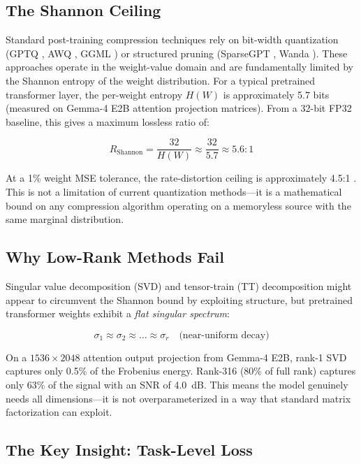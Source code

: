 \documentclass[11pt,a4paper]{article}
\begin{document}
\subsection{The Shannon Ceiling}

Standard post-training compression techniques rely on bit-width quantization (GPTQ
\cite{frantar2023gptq}, AWQ \cite{lin2024awq}, GGML \cite{gerganov2023ggml}) or
structured pruning (SparseGPT \cite{frantar2023sparsegpt}, Wanda \cite{sun2023wanda}).
These approaches operate in the weight-value domain and are fundamentally limited by
the Shannon entropy of the weight distribution. For a typical pretrained transformer
layer, the per-weight entropy $H(W)$ is approximately 5.7 bits (measured on Gemma-4
E2B attention projection matrices). From a 32-bit FP32 baseline, this gives a maximum
lossless ratio of:

\[
	R_{\text{Shannon}} = \frac{32}{H(W)} \approx \frac{32}{5.7} \approx 5.6:1
\]

At a 1\% weight MSE tolerance, the rate-distortion ceiling is approximately 4.5:1
\cite{shannon1959coding}. This is not a limitation of current quantization methods---it
is a mathematical bound on any compression algorithm operating on a memoryless source
with the same marginal distribution.

\subsection{Why Low-Rank Methods Fail}

Singular value decomposition (SVD) and tensor-train (TT) decomposition might appear to
circumvent the Shannon bound by exploiting structure, but pretrained transformer weights
exhibit a \emph{flat singular spectrum}:

\[
	\sigma_1 \approx \sigma_2 \approx \dots \approx \sigma_r \quad \text{(near-uniform decay)}
\]

On a $1536 \times 2048$ attention output projection from Gemma-4 E2B, rank-1 SVD captures
only 0.5\% of the Frobenius energy. Rank-316 (80\% of full rank) captures only 63\% of
the signal with an SNR of 4.0~dB. This means the model genuinely needs all dimensions---it
is not overparameterized in a way that standard matrix factorization can exploit.

\subsection{The Key Insight: Task-Level Loss}
\end{document}
